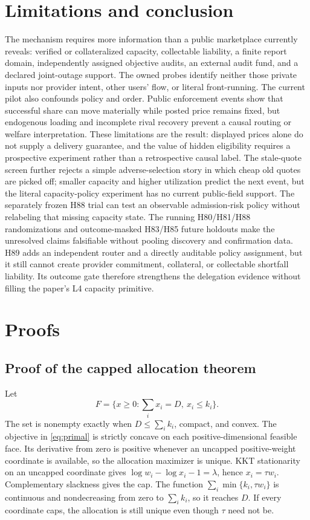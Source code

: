 \documentclass[11pt]{article}
\theoremstyle{definition}
\begin{document}
\section{Limitations and conclusion}

The mechanism requires more information than a public marketplace currently
reveals: verified or collateralized capacity, collectable liability, a finite
report domain, independently assigned objective audits, an external audit fund,
and a declared joint-outage support. The owned probes identify neither those
private inputs nor provider intent, other users' flow, or literal front-running.
The current pilot also confounds policy and order. Public enforcement events
show that successful share can move materially while posted price remains
fixed, but endogenous loading and incomplete rival recovery prevent a causal
routing or welfare interpretation. These limitations are the result: displayed
prices alone do not supply a delivery guarantee, and the value of hidden
eligibility requires a prospective experiment rather than a retrospective
causal label. The stale-quote screen further rejects a simple adverse-selection
story in which cheap old quotes are picked off; smaller capacity and higher
utilization predict the next event, but the literal capacity-policy experiment
has no current public-field support. The separately frozen H88 trial can test
an observable admission-risk policy without relabeling that missing capacity
state. The running H80/H81/H88 randomizations and outcome-masked H83/H85 future
holdouts make the unresolved claims falsifiable without pooling discovery and
confirmation data. H89 adds an independent router and a directly auditable
policy assignment, but it still cannot create provider commitment, collateral,
or collectable shortfall liability. Its outcome gate therefore strengthens the
delegation evidence without filling the paper's L4 capacity primitive.




\appendix
\section{Proofs}

\subsection{Proof of the capped allocation theorem}
Let
\[
 F=\{x\geq0:\sum_i x_i=D,\ x_i\leq k_i\}.
\]
The set is nonempty exactly when $D\leq\sum_i k_i$, compact, and convex. The
objective in \cref{eq:primal} is strictly concave on each positive-dimensional
feasible face. Its derivative from zero is positive whenever an uncapped
positive-weight coordinate is available, so the allocation maximizer is
unique. KKT stationarity on an uncapped coordinate gives
$\log w_i-\log x_i-1=\lambda$, hence $x_i=\tau w_i$. Complementary slackness
gives the cap. The function
$\sum_i\min\{k_i,\tau w_i\}$ is continuous and nondecreasing from zero to
$\sum_i k_i$, so it reaches $D$. If every coordinate caps, the allocation is
still unique even though $\tau$ need not be.
\end{document}
